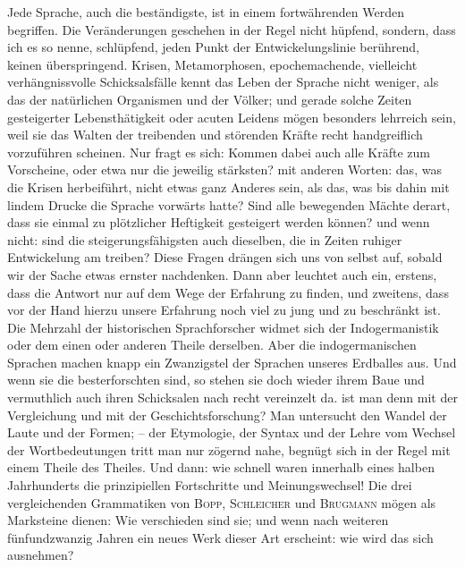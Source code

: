 {Jede Sprache, auch die beständigste, ist in einem fortwährenden Werden begriffen. Die Veränderungen geschehen in der Regel nicht hüpfend, sondern, dass ich es so nenne, schlüpfend, jeden Punkt der Entwickelungslinie berührend, keinen überspringend. Krisen, Metamorphosen, epochemachende, vielleicht verhängnissvolle Schicksalsfälle kennt das Leben der Sprache nicht weniger, als das der natürlichen Organismen und der Völker; und gerade solche Zeiten gesteigerter Lebensthätigkeit oder acuten Leidens mögen besonders lehrreich sein, weil sie das Walten der treibenden und störenden Kräfte recht handgreiflich vorzuführen scheinen. Nur fragt es sich: Kommen dabei auch alle Kräfte zum Vorscheine, oder etwa nur die jeweilig stärksten? mit anderen Worten:  das, was die Krisen herbeiführt, nicht etwas ganz Anderes sein, als das, was bis dahin mit lindem Drucke die Sprache vorwärts  hatte? Sind alle bewegenden Mächte derart, dass sie einmal zu plötzlicher Heftigkeit ge\label{fp.181}steigert werden können? und wenn nicht: sind die steigerungsfähigsten auch dieselben, die in Zeiten ruhiger Entwickelung am  treiben? Diese Fragen drängen sich uns von selbst auf, sobald wir der Sache etwas ernster nachdenken. Dann aber leuchtet auch ein, erstens, dass die Antwort nur auf dem Wege der Erfahrung zu finden, und zweitens, dass vor der Hand hierzu unsere Erfahrung noch viel zu jung und zu beschränkt ist. Die Mehrzahl der historischen Sprachforscher widmet sich der Indogermanistik oder dem einen oder anderen Theile derselben. Aber die indogermanischen Sprachen machen knapp ein Zwanzigstel der Sprachen unseres Erdballes aus. Und wenn sie die besterforschten sind, so stehen sie doch wieder ihrem Baue und vermuthlich auch ihren Schicksalen nach recht vereinzelt da.  ist man denn mit der Vergleichung und mit der Geschichtsforschung? Man untersucht den Wandel der Laute und der Formen; – der Etymologie, der Syntax und der Lehre vom Wechsel der Wortbedeutungen tritt man nur zögernd nahe, begnügt sich in der Regel mit einem Theile des Theiles. Und dann: wie schnell waren innerhalb eines halben Jahrhunderts die prinzipiellen Fortschritte und Meinungswechsel! Die drei vergleichenden Grammatiken von \textsc{Bopp}, \textsc{Schleicher} und \textsc{Brugmann} mögen als Marksteine dienen: \label{sp.170} Wie verschieden sind sie; und wenn nach weiteren fünfundzwanzig Jahren ein neues Werk dieser Art erscheint: wie wird das sich ausnehmen?

}
